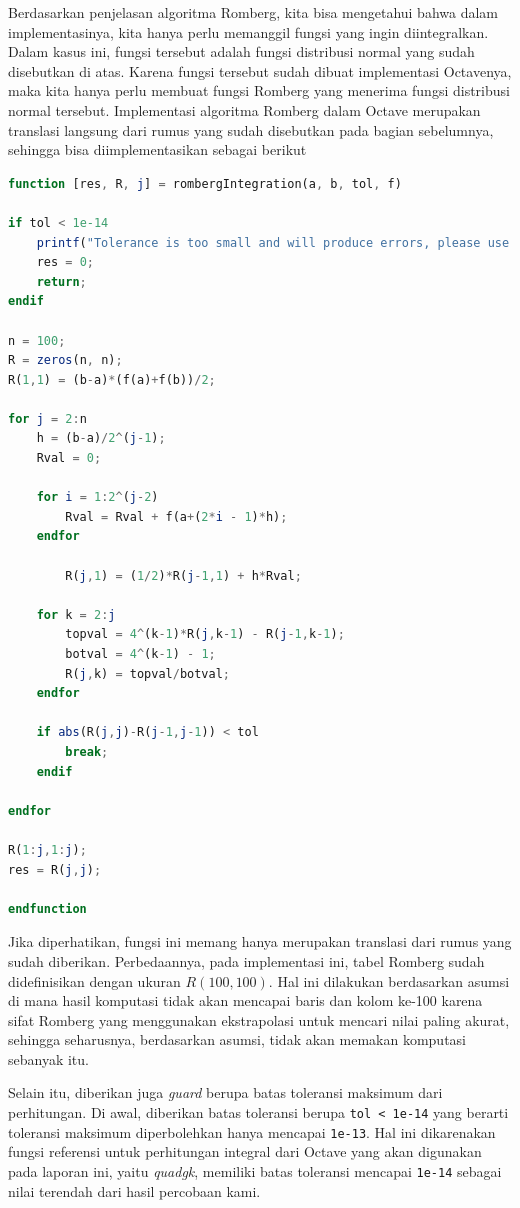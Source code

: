 \documentclass[journal,12pt,onecolumn,a4paper]{IEEEtran}
\begin{document}
Berdasarkan penjelasan algoritma Romberg, kita bisa mengetahui bahwa dalam implementasinya, kita hanya perlu memanggil fungsi yang ingin diintegralkan. Dalam kasus ini, fungsi tersebut adalah fungsi distribusi normal yang sudah disebutkan di atas. Karena fungsi tersebut sudah dibuat implementasi Octavenya, maka kita hanya perlu membuat fungsi Romberg yang menerima fungsi distribusi normal tersebut. Implementasi algoritma Romberg dalam Octave merupakan translasi langsung dari rumus yang sudah disebutkan pada bagian sebelumnya, sehingga bisa diimplementasikan sebagai berikut
\begin{center}
	\begin{lstlisting}[language=Octave]
function [res, R, j] = rombergIntegration(a, b, tol, f)

if tol < 1e-14
	printf("Tolerance is too small and will produce errors, please use larger values\n")
	res = 0;
	return;
endif

n = 100;
R = zeros(n, n);
R(1,1) = (b-a)*(f(a)+f(b))/2;

for j = 2:n
	h = (b-a)/2^(j-1);
	Rval = 0;

	for i = 1:2^(j-2)
		Rval = Rval + f(a+(2*i - 1)*h);
	endfor

		R(j,1) = (1/2)*R(j-1,1) + h*Rval;

	for k = 2:j
		topval = 4^(k-1)*R(j,k-1) - R(j-1,k-1);
		botval = 4^(k-1) - 1;
		R(j,k) = topval/botval;
	endfor

	if abs(R(j,j)-R(j-1,j-1)) < tol
		break;
	endif

endfor

R(1:j,1:j);
res = R(j,j);

endfunction
	\end{lstlisting}
\end{center}

Jika diperhatikan, fungsi ini memang hanya merupakan translasi dari rumus yang sudah diberikan. Perbedaannya, pada implementasi ini, tabel Romberg sudah didefinisikan dengan ukuran \(R(100,100)\). Hal ini dilakukan berdasarkan asumsi di mana hasil komputasi tidak akan mencapai baris dan kolom ke-100 karena sifat Romberg yang menggunakan ekstrapolasi untuk mencari nilai paling akurat, sehingga seharusnya, berdasarkan asumsi, tidak akan memakan komputasi sebanyak itu.

Selain itu, diberikan juga \emph{guard} berupa batas toleransi maksimum dari perhitungan. Di awal, diberikan batas toleransi berupa \lstinline{tol < 1e-14} yang berarti toleransi maksimum diperbolehkan hanya mencapai \lstinline{1e-13}. Hal ini dikarenakan fungsi referensi untuk perhitungan integral dari Octave yang akan digunakan pada laporan ini, yaitu \emph{quadgk}, memiliki batas toleransi mencapai \lstinline{1e-14} sebagai nilai terendah dari hasil percobaan kami.
\end{document}
